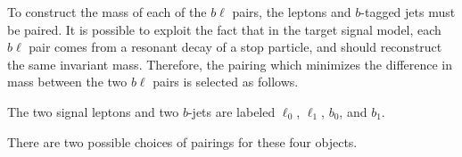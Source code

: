 To construct the mass of each of the $b\ell$ pairs, the leptons and $b$-tagged
jets must be paired.
It is possible to exploit the fact that in the target signal model, each
$b\ell$ pair comes from a resonant decay of a stop particle, and should
reconstruct the same invariant mass.
Therefore, the pairing which minimizes the difference in mass between the two
$b\ell$ pairs is selected as follows.

The two signal leptons and two $b$-jets are labeled $\ell_0$, $\ell_1$, $b_0$,
and $b_1$.

%
\begin{center}
\end{center}
%
There are two possible choices of pairings for these four objects.
%
